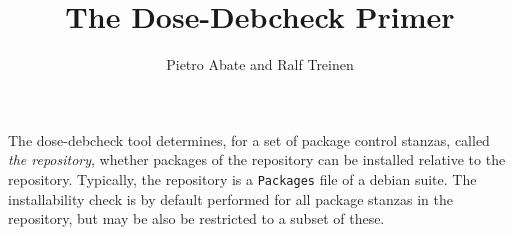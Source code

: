 \documentclass{article}
\title{The Dose-Debcheck Primer}
\author{Pietro Abate and Ralf Treinen}
\newcommand{\debcheck}{dose-debcheck}
\begin{document}
\maketitle

The \debcheck{} tool determines, for a set of package control stanzas,
called \emph{the repository}, whether packages of the repository can
be installed relative to the repository. Typically, the repository is
a \texttt{Packages} file of a debian suite. The installability check
is by default performed for all package stanzas in the repository, but
may be also be restricted to a subset of these.

\tableofcontents












\end{document}
